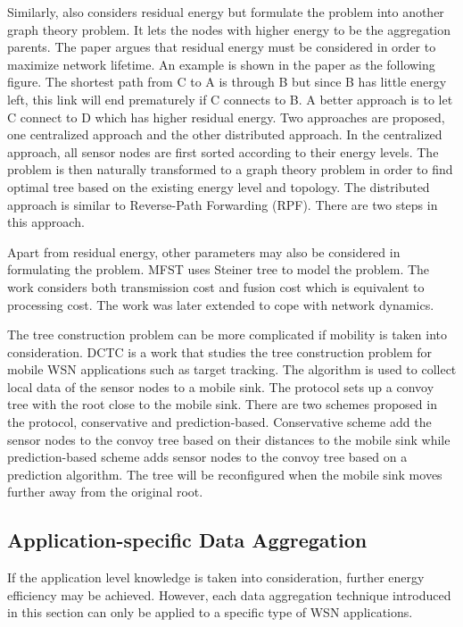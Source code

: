 Similarly, \cite{lpt} also considers residual energy but formulate the problem into another graph theory problem. It lets the nodes with higher energy to be the aggregation parents. The paper argues that residual energy must be considered in order to maximize network lifetime. An example is shown in the paper as the following figure. The shortest path from C to A is through B but since B has little energy left, this link will end prematurely if C connects to B. A better approach is to let C connect to D which has higher residual energy. Two approaches are proposed, one centralized approach and the other distributed approach. In the centralized approach, all sensor nodes are first sorted according to their energy levels. The problem is then naturally transformed to a graph theory problem in order to find optimal tree based on the existing energy level and topology. The distributed approach is similar to Reverse-Path Forwarding (RPF). There are two steps in this approach.

Apart from residual energy, other parameters may also be considered in formulating the problem. MFST \cite{mfst} uses Steiner tree to model the problem. The work considers both transmission cost and fusion cost which is equivalent to processing cost. The work was later extended to cope with network dynamics.

The tree construction problem can be more complicated if mobility is taken into consideration. DCTC \cite{dctc} is a work that studies the tree construction problem for mobile WSN applications such as target tracking. The algorithm is used to collect local data of the sensor nodes to a mobile sink. The protocol sets up a convoy tree with the root close to the mobile sink. There are two schemes proposed in the protocol, conservative and prediction-based. Conservative scheme add the sensor nodes to the convoy tree based on their distances to the mobile sink while prediction-based scheme adds sensor nodes to the convoy tree based on a prediction algorithm. The tree will be reconfigured when the mobile sink moves further away from the original root.

\subsection{Application-specific Data Aggregation}
If the application level knowledge is taken into consideration, further energy efficiency may be achieved. However, each data aggregation technique introduced in this section can only be applied to a specific type of WSN applications. 

